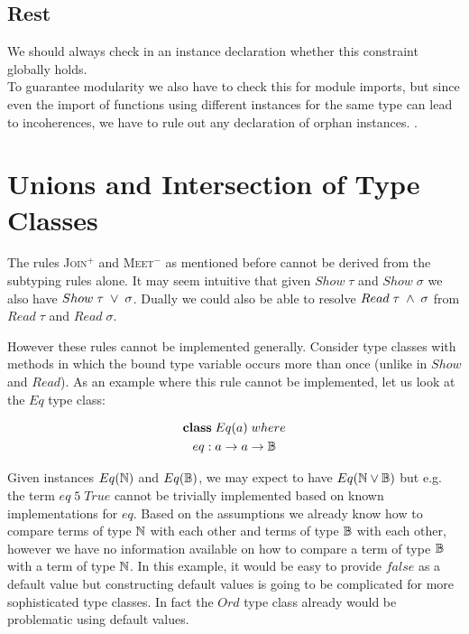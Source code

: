   \subsection{Rest}
  We should always check in an instance declaration whether this constraint globally holds. \\
  To guarantee modularity we also have to check this for module imports, but since even the import of functions using different instances for the same type can lead to incoherences, we have to rule out any declaration of orphan instances.
  \cite{Kilpatrick2019-cy}.

\section{Unions and Intersection of Type Classes}

The rules \textsc{Join}$^+$ and \textsc{Meet}$^-$ as mentioned before cannot be derived from the subtyping rules alone.
It may seem intuitive that given $Show \; \tau$ and $Show \; \sigma$ we also have $Show \; \tau \; \vee \; \sigma$.
Dually we could also be able to resolve $Read \; \tau \; \wedge \; \sigma$ from $Read \; \tau$ and $Read \; \sigma$.

However these rules cannot be implemented generally.
Consider type classes with methods in which the bound type variable occurs more than once (unlike in $Show$ and $Read$).
As an example where this rule cannot be implemented, let us look at the $Eq$ type class:

\begin{gather}
\nonumber {\bf class} \; Eq(a) \; where\\
\nonumber  eq : a \to a \to \mathbb{B}
\end{gather}

Given instances $Eq(\mathbb{N})$ and $Eq(\mathbb{B})$, we may expect to have $Eq(\mathbb{N} \vee \mathbb{B})$ but e.g. the term $eq \; 5 \; True$ cannot be trivially implemented based on known implementations for $eq$.
Based on the assumptions we already know how to compare terms of type $\mathbb{N}$ with each other and terms of type $\mathbb{B}$ with each other,
however we have no information available on how to compare a term of type $\mathbb{B}$ with a term of type $\mathbb{N}$.
In this example, it would be easy to provide $false$ as a default value but constructing default values is going to be complicated for more sophisticated type classes.
In fact the $Ord$ type class already would be problematic using default values.

